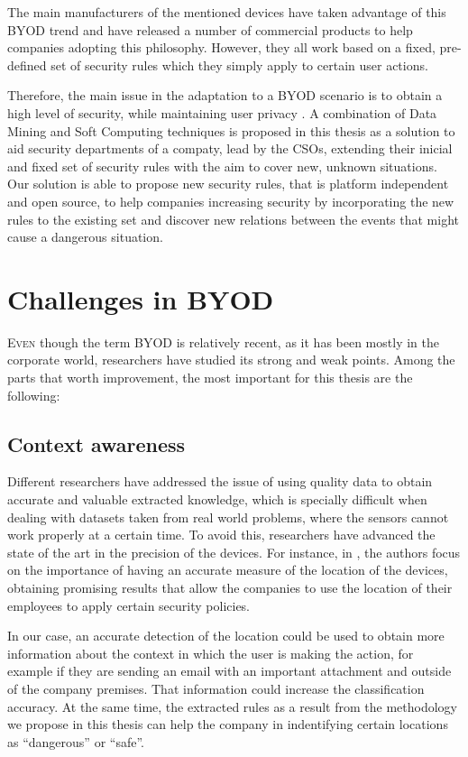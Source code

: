 The main manufacturers of the mentioned devices have taken advantage of this BYOD trend and have released a number of commercial products to help companies adopting this philosophy. However, they all work based on a fixed, pre-defined set of security rules which they simply apply to certain user actions.

Therefore, the main issue in the adaptation to a BYOD scenario is to obtain a high level of security, while maintaining user privacy \cite{miller2012byod}. A combination of Data Mining and Soft Computing techniques is proposed in this thesis as a solution to aid security departments of a compaty, lead by the CSOs, extending their inicial and fixed set of security rules with the aim to cover new, unknown situations.
Our solution is able to propose new security rules, that is platform independent and open source, to help companies increasing security by incorporating the new rules to the existing set and discover new relations between the events that might cause a dangerous situation.

\section{Challenges in BYOD}
\label{sec:intro:challenges}

\lettrine{E}{ven} though the term BYOD is relatively recent, as it has been mostly in the corporate world, researchers have studied its strong and weak points. Among the parts that worth improvement, the most important for this thesis are the following:

\subsection{Context awareness}
\label{subsec:context}

Different researchers have addressed the issue of using quality data to obtain accurate and valuable extracted knowledge, which is specially difficult when dealing with datasets taken from real world problems, where the sensors cannot work properly at a certain time. To avoid this, researchers have advanced the state of the art in the precision of the devices.
For instance, in \cite{rios2015mobile}, the authors focus on the importance of having an accurate measure of the location of the devices, obtaining promising results that allow the companies to use the location of their employees to apply certain security policies.

In our case, an accurate detection of the location could be used to obtain more information about the context in which the user is making the action, for example if they are sending an email with an important attachment and outside of the company premises. That information could increase the classification accuracy. At the same time, the extracted rules as a result from the methodology we propose in this thesis can help the company in indentifying certain locations as ``dangerous'' or ``safe''.

